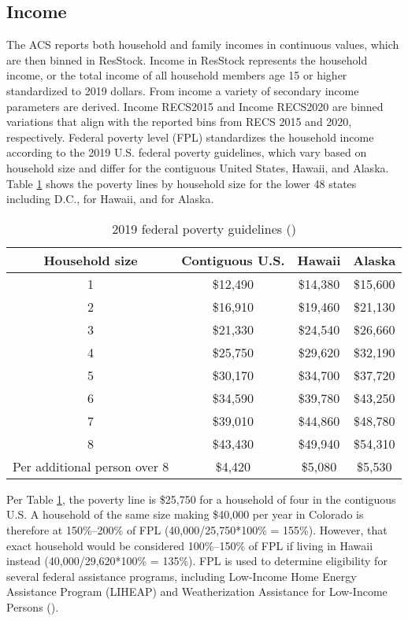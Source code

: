 \subsection{Income}
The ACS reports both household and family incomes in continuous values, which are then binned in ResStock. Income in ResStock represents the household income, or the total income of all household members age 15 or higher standardized to 2019 dollars. From income a variety of secondary income parameters are derived. Income RECS2015 and Income RECS2020 are binned variations that align with the reported bins from RECS 2015 and 2020, respectively. Federal poverty level (FPL) standardizes the household income according to the 2019 U.S. federal poverty guidelines, which vary based on household size and differ for the contiguous United States, Hawaii, and Alaska. Table \ref{tab:fpl} shows the poverty lines by household size for the lower 48 states including D.C., for Hawaii, and for Alaska.


\begin{table}
    \caption{2019 federal poverty guidelines (\cite{aspe_2019_fpl})}
    \label{tab:fpl}
    \centering
    \begin{tabular}{|c|c|c|c|}
    \hline
        Household size & Contiguous U.S. & Hawaii & Alaska \\
        \hline
        1 & \$12,490 & \$14,380 & \$15,600 \\
        2 & \$16,910 & \$19,460 & \$21,130 \\
        3 & \$21,330 & \$24,540 & \$26,660 \\
        4 & \$25,750 & \$29,620 & \$32,190 \\
        5 & \$30,170 & \$34,700 & \$37,720 \\
        6 & \$34,590 & \$39,780 & \$43,250 \\
        7 & \$39,010 & \$44,860 & \$48,780 \\
        8 & \$43,430 & \$49,940 & \$54,310 \\
        \hline
        Per additional person over 8 & \$4,420 & \$5,080 & \$5,530 \\
        \hline
    \end{tabular}
\end{table}

Per Table \ref{tab:fpl}, the poverty line is \$25,750 for a household of four in the contiguous U.S. A household of the same size making \$40,000 per year in Colorado is therefore at 150\%--200\% of FPL (40,000/25,750*100\% = 155\%). However, that exact household would be considered 100\%--150\% of FPL if living in Hawaii instead (40,000/29,620*100\% = 135\%). FPL is used to determine eligibility for several federal assistance programs, including Low-Income Home Energy Assistance Program (LIHEAP) and Weatherization Assistance for Low-Income Persons (\cite{aspe_fpl_use}).

